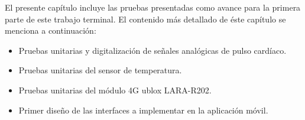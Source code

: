 El presente capítulo incluye las pruebas presentadas como avance para la primera parte de este trabajo terminal. El contenido más detallado de éste capítulo se menciona a continuación:

\begin{itemize}
	\item Pruebas unitarias y digitalización de señales analógicas de pulso cardíaco.
	\item Pruebas unitarias del sensor de temperatura.
	\item Pruebas unitarias del módulo 4G ublox LARA-R202.
	\item Primer diseño de las interfaces a implementar en la aplicación móvil.
\end{itemize}
\newpage

